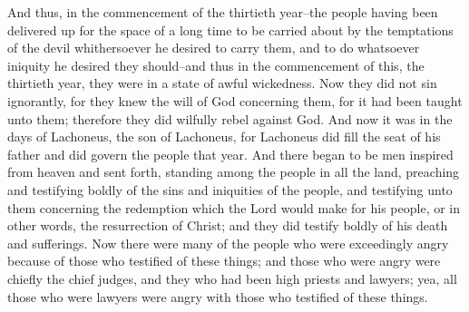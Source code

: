 And thus, in the commencement of the thirtieth year--the people having been delivered up for the space of a long time to be carried about by the temptations of the devil whithersoever he desired to carry them, and to do whatsoever iniquity he desired they should--and thus in the commencement of this, the thirtieth year, they were in a state of awful wickedness.
\bverse \iffalse Now they did not sin ignorantly, for they knew the will of God concerning them, for it had been taught unto them; therefore they did wilfully rebel against God. \fi
Now they did not sin ignorantly, for they knew the will of God concerning them, for it had been taught unto them; therefore they did wilfully rebel against God.
\bverse \iffalse And now it was in the days of Lachoneus, the son of Lachoneus, for Lachoneus did fill the seat of his father and did govern the people that year. \fi
And now it was in the days of Lachoneus, the son of Lachoneus, for Lachoneus did fill the seat of his father and did govern the people that year.
\bverse \iffalse And there began to be men inspired from heaven and sent forth, standing among the people in all the land, preaching and testifying boldly of the sins and iniquities of the people, and testifying unto them concerning the redemption which the Lord would make for his people, or in other words, the resurrection of Christ; and they did testify boldly of his death and sufferings. \fi
And there began to be men inspired from heaven and sent forth, standing among the people in all the land, preaching and testifying boldly of the sins and iniquities of the people, and testifying unto them concerning the redemption which the Lord would make for his people, or in other words, the resurrection of Christ; and they did testify boldly of his death and sufferings.
\bverse \iffalse Now there were many of the people who were exceedingly angry because of those who testified of these things; and those who were angry were chiefly the chief judges, and they who had been high priests and lawyers; yea, all those who were lawyers were angry with those who testified of these things. \fi
Now there were many of the people who were exceedingly angry because of those who testified of these things; and those who were angry were chiefly the chief judges, and they who had been high priests and lawyers; yea, all those who were lawyers were angry with those who testified of these things.
\bverse \iffalse Now there was no lawyer nor judge nor high priest that could have power to condemn any one to death save their condemnation was signed by the governor of the land. \fi
